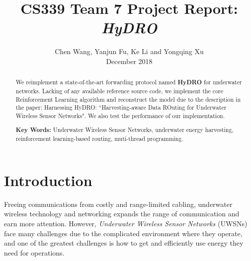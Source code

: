 \documentclass[10pt,twocolumn,letterpaper]{article}
\begin{document}
\title{
	CS339 Team 7 Project Report: \textit{HyDRO}\\
}

\author{
  Chen Wang, Yanjun Fu, Ke Li and Yongqing Xu\\
  December 2018
}

\maketitle

\begin{abstract}
	We reimplement a state-of-the-art forwarding protocol named \textbf{HyDRO} for underwater networks. Lacking of any available reference source code, we implement the core Reinforcement Learning algorithm and reconstruct the model due to the description in the paper: Harnessing HyDRO: ``Harvesting-aware Data ROuting for Underwater Wireless Sensor Networks". \cite{Basagni:2018:HHH:3209582.3209610} We also test the performance of our implementation.
	
	\textbf{Key Words:}
	Underwater Wireless Sensor Networks, underwater energy harvesting, reinforcement learning-based routing, muti-thread programming.
\end{abstract}

\section{Introduction}


Freeing communications from costly and range-limited cabling, underwater wireless technology and networking expands the range of communication and earn more attention. However, \textsl{Underwater Wireless Sensor Networks} (UWSNs) face many challenges due to the complicated environment where they operate, and one of the greatest challenges is how to get and efficiently use energy they need for operations.

\end{document}
